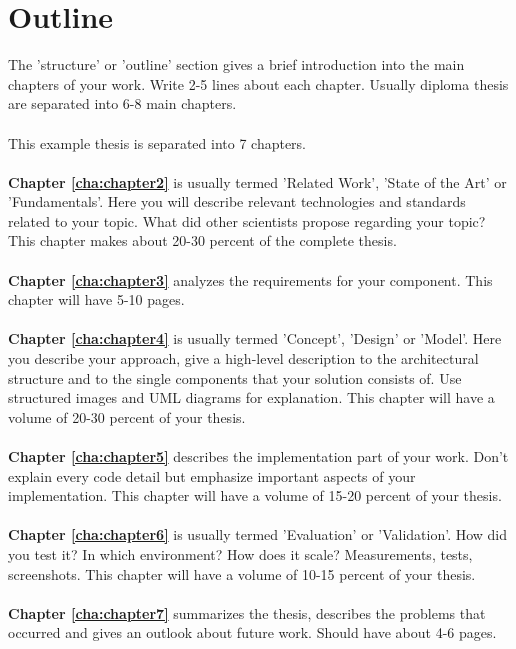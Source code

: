 \section{Outline\label{sec:outline}}

The 'structure' or 'outline' section gives a brief introduction into the main chapters of your work. Write 2-5 lines about each chapter. Usually diploma thesis are separated into 6-8 main chapters. 
\\
\\
\noindent This example thesis is separated into 7 chapters.
\\
\\
\textbf{Chapter \ref{cha:chapter2}} is usually termed 'Related Work', 'State of the Art' or 'Fundamentals'. Here you will describe relevant technologies and standards related to your topic. What did other scientists propose regarding your topic? This chapter makes about 20-30 percent of the complete thesis.
\\
\\
\textbf{Chapter \ref{cha:chapter3}} analyzes the requirements for your component. This chapter will have 5-10 pages.
\\
\\
\textbf{Chapter \ref{cha:chapter4}} is usually termed 'Concept', 'Design' or 'Model'. Here you describe your approach, give a high-level description to the architectural structure and to the single components that your solution consists of. Use structured images and UML diagrams for explanation. This chapter will have a volume of 20-30 percent of your thesis.
\\
\\
\textbf{Chapter \ref{cha:chapter5}} describes the implementation part of your work. Don't explain every code detail but emphasize important aspects of your implementation. This chapter will have a volume of 15-20 percent of your thesis.
\\
\\
\textbf{Chapter \ref{cha:chapter6}} is usually termed 'Evaluation' or 'Validation'. How did you test it? In which environment? How does it scale? Measurements, tests, screenshots. This chapter will have a volume of 10-15 percent of your thesis.
\\
\\
\textbf{Chapter \ref{cha:chapter7}} summarizes the thesis, describes the problems that occurred and gives an outlook about future work. Should have about 4-6 pages.